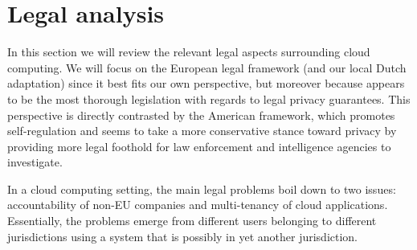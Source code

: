 \documentclass[12pt]{article}
\begin{document}


\section{Legal analysis}
\label{sec:legal_analysis}

In this section we will review the relevant legal aspects surrounding cloud computing.
We will focus on the European legal framework (and our local Dutch adaptation) since it best fits our own perspective, but moreover because appears to be the most thorough legislation with regards to legal privacy guarantees.
This perspective is directly contrasted by the American framework, which promotes self-regulation and seems to take a more conservative stance toward privacy by providing more legal foothold for law enforcement and intelligence agencies to investigate.

In a cloud computing setting, the main legal problems boil down to two issues: accountability of non-EU companies and multi-tenancy of cloud applications.
Essentially, the problems emerge from different users belonging to different jurisdictions using a system that is possibly in yet another jurisdiction.
\end{document}
